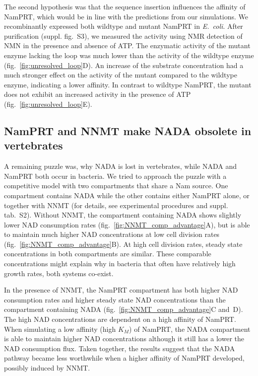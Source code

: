 The second hypothesis was that the sequence insertion influences the affinity of NamPRT, which would be in line with the predictions from our simulations. We recombinantly expressed both wildtype and mutant NamPRT in \textit{E.~coli}. After purification (suppl. fig.~S3), we measured the activity using NMR detection of NMN in the presence and absence of ATP. The enzymatic activity of the mutant enzyme lacking the loop was much lower than the activity of the wildtype enzyme (fig.~\ref{fig:unresolved_loop}D). An increase of the substrate concentration had a much stronger effect on the activity of the mutant compared to the wildtype enzyme, indicating a lower affinity. In contrast to wildtype NamPRT, the mutant does not exhibit an increased activity in the presence of ATP (fig.~\ref{fig:unresolved_loop}E).


\subsection{NamPRT and NNMT make NADA obsolete in vertebrates}

A remaining puzzle was, why NADA is lost in vertebrates, while NADA and NamPRT both occur in bacteria. We tried to approach the puzzle with a competitive model with two compartments that share a Nam source. One compartment contains NADA while the other contains either NamPRT alone, or together with NNMT (for details, see experimental procedures and suppl. tab.~S2). Without NNMT, the compartment containing NADA shows slightly lower NAD consumption rates (fig.~\ref{fig:NNMT_comp_advantage}A), but is able to maintain much higher NAD concentrations at low cell division rates (fig.~\ref{fig:NNMT_comp_advantage}B). At high cell division rates, steady state concentrations in both compartments are similar. These comparable concentrations might explain why in bacteria that often have relatively high growth rates, both systems co-exist.

In the presence of NNMT, the NamPRT compartment has both higher NAD consumption rates and higher steady state NAD concentrations than the compartment containing NADA (fig.~\ref{fig:NNMT_comp_advantage}C and~D). The high NAD concentrations are dependent on a high affinity of NamPRT. When simulating a low affinity (high $K_{M}$) of NamPRT, the NADA compartment is able to maintain higher NAD concentrations although it still has a lower the NAD consumption flux. Taken together, the results suggest that the NADA pathway became less worthwhile when a higher affinity of NamPRT developed, possibly induced by NNMT.
